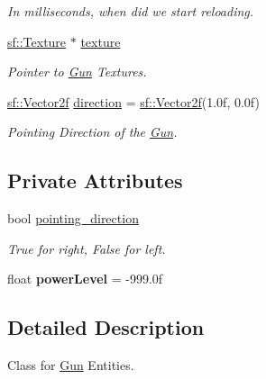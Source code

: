 \begin{DoxyCompactItemize}
\begin{DoxyCompactList}\small\item\em In milliseconds, when did we start reloading. \end{DoxyCompactList}\item 
\mbox{\label{class_gun_a11387b8883fe8384095c154c99742f14}} 
\mbox{\hyperlink{classsf_1_1_texture}{sf\+::\+Texture}} $\ast$ \mbox{\hyperlink{class_gun_a11387b8883fe8384095c154c99742f14}{texture}}
\begin{DoxyCompactList}\small\item\em Pointer to \mbox{\hyperlink{class_gun}{Gun}} Textures. \end{DoxyCompactList}\item 
\mbox{\label{class_gun_af7ceff1d36e46ddaec64a5644a0c6b94}} 
\mbox{\hyperlink{classsf_1_1_vector2}{sf\+::\+Vector2f}} \mbox{\hyperlink{class_gun_af7ceff1d36e46ddaec64a5644a0c6b94}{direction}} = \mbox{\hyperlink{classsf_1_1_vector2}{sf\+::\+Vector2f}}(1.\+0f, 0.\+0f)
\begin{DoxyCompactList}\small\item\em Pointing Direction of the \mbox{\hyperlink{class_gun}{Gun}}. \end{DoxyCompactList}\end{DoxyCompactItemize}
\subsection*{Private Attributes}
\begin{DoxyCompactItemize}
\item 
\mbox{\label{class_gun_a2c9e04f7eab9aef7060ef7de0508d20d}} 
bool \mbox{\hyperlink{class_gun_a2c9e04f7eab9aef7060ef7de0508d20d}{pointing\+\_\+direction}}
\begin{DoxyCompactList}\small\item\em True for right, False for left. \end{DoxyCompactList}\item 
\mbox{\label{class_gun_acbb48221a20e81666f5a9a56b36e7b40}} 
float {\bfseries power\+Level} = -\/999.\+0f
\end{DoxyCompactItemize}


\subsection{Detailed Description}
Class for \mbox{\hyperlink{class_gun}{Gun}} Entities. 

